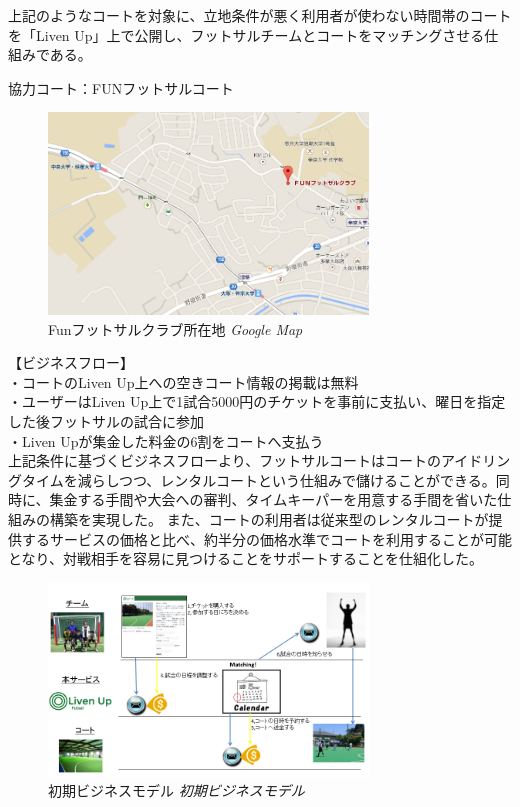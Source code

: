 上記のようなコートを対象に、立地条件が悪く利用者が使わない時間帯のコートを「Liven Up」上で公開し、フットサルチームとコートをマッチングさせる仕組みである。

協力コート：FUNフットサルコート



\begin{figure}[htbp]
	\centering
	\includegraphics[width=85mm, bb=0 0 600 400]{figures/fun.jpg}
	\caption{Funフットサルクラブ所在地 {\itshape Google Map}}
	\label{Funフットサルクラブ所在地}
\end{figure}




【ビジネスフロー】
\\
・コートのLiven Up上への空きコート情報の掲載は無料
\\・ユーザーはLiven Up上で1試合5000円のチケットを事前に支払い、曜日を指定した後フットサルの試合に参加
\\・Liven Upが集金した料金の6割をコートへ支払う
\\
上記条件に基づくビジネスフローより、フットサルコートはコートのアイドリングタイムを減らしつつ、レンタルコートという仕組みで儲けることができる。同時に、集金する手間や大会への審判、タイムキーパーを用意する手間を省いた仕組みの構築を実現した。
また、コートの利用者は従来型のレンタルコートが提供するサービスの価格と比べ、約半分の価格水準でコートを利用することが可能となり、対戦相手を容易に見つけることをサポートすることを仕組化した。

\begin{figure}[htbp]
	\centering
	\includegraphics[width=85mm, bb=0 0 500 400]{figures/bm.jpg}
	\caption{初期ビジネスモデル {\itshape 初期ビジネスモデル}}
	\label{初期ビジネスモデル}
\end{figure}




